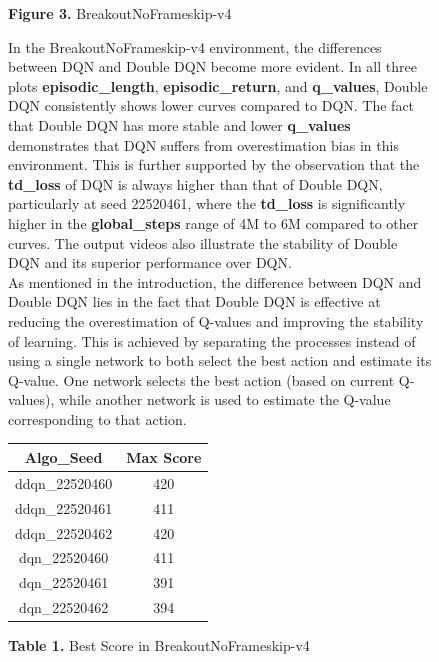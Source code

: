 \documentclass[english, a4paper,12pt]{article}
\begin{document}
\begin{figure}[h!]
\begin{minipage}{0.5\textwidth}
        \caption*{\textbf{Figure 3.} BreakoutNoFrameskip-v4}
    \end{minipage}%
    \begin{minipage}{0.5\textwidth}
        \hspace*{5mm}In the BreakoutNoFrameskip-v4 environment, the differences between DQN and Double DQN become more evident. In all three plots \textbf{episodic\_length}, \textbf{episodic\_return}, and \textbf{q\_values}, Double DQN consistently shows lower curves compared to DQN. The fact that Double DQN has more stable and lower \textbf{q\_values} demonstrates that DQN suffers from overestimation bias in this environment. This is further supported by the observation that the \textbf{td\_loss} of DQN is always higher than that of Double DQN, particularly at seed 22520461, where the \textbf{td\_loss} is significantly higher in the \textbf{global\_steps} range of 4M to 6M compared to other curves. The output videos also illustrate the stability of Double DQN and its superior performance over DQN.
        \\
        \hspace*{5mm} As mentioned in the introduction, the difference between DQN and Double DQN lies in the fact that Double DQN is effective at reducing the overestimation of Q-values and improving the stability of learning. This is achieved by separating the processes instead of using a single network to both select the best action and estimate its Q-value. One network selects the best action (based on current Q-values), while another network is used to estimate the Q-value corresponding to that action.
        \begin{center}
                \begin{tabular}{|c|c|}
                \hline
                \textbf{Algo\_Seed} & \textbf{Max Score} \\
                \hline
                ddqn\_22520460 & 420 \\
                ddqn\_22520461 & 411 \\
                ddqn\_22520462 & 420 \\
                dqn\_22520460  & 411 \\
                dqn\_22520461  & 391 \\
                dqn\_22520462  & 394 \\
                \hline
                \end{tabular}
                \caption*{\footnotesize \textbf{Table 1.} Best Score in BreakoutNoFrameskip-v4}
        \end{center}

    \end{minipage}
\end{figure}
\end{document}
